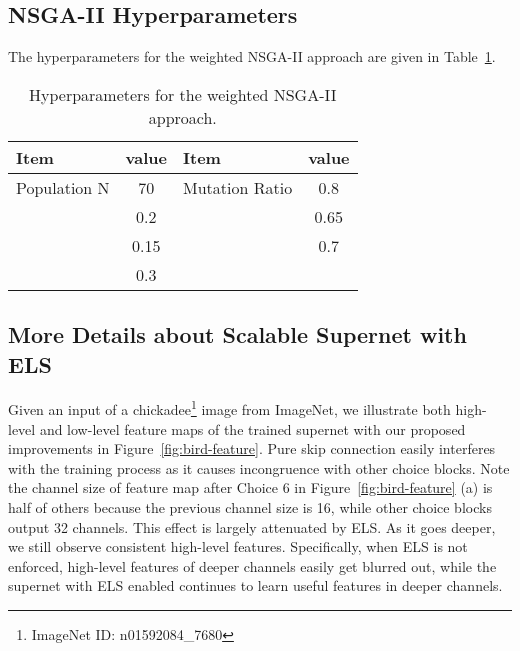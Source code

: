 \documentclass[10pt,twocolumn,letterpaper]{article}
\theoremstyle{definition}
\begin{document}
\subsection{NSGA-II Hyperparameters}
The hyperparameters for the weighted NSGA-II approach are given in Table~\ref{tab:pipelienhyper}.

\begin{table}[ht]	\begin{center}
		\begin{small}
				\begin{tabular}{|l|c|l|c|}
					\hline
					Item & value & Item & value \\
					\hline
					Population N & 70 & Mutation Ratio  & 0.8 \\
					 & 0.2 &    & 0.65 \\
					 & 0.15 &  & 0.7 \\
					 & 0.3 & & \\
					\hline
				\end{tabular}
		\end{small}
	\end{center}
	\smallskip
	\caption{Hyperparameters for the weighted NSGA-II approach.}
	\label{tab:pipelienhyper}
\end{table}

\subsection{More Details about Scalable Supernet with ELS}
Given an input of a chickadee\footnote{ImageNet ID: n01592084\_7680} image from ImageNet, we illustrate both high-level and low-level feature maps of the trained supernet with our proposed improvements in Figure~\ref{fig:bird-feature}. Pure skip connection easily interferes with the training process as it causes incongruence with other choice blocks. Note the channel size of feature map after Choice 6 in Figure~\ref{fig:bird-feature} (a) is half of others because the previous channel size is 16, while other choice blocks output 32 channels. This effect is largely attenuated by ELS. As it goes deeper, we still observe consistent high-level features. Specifically, when ELS is not enforced, high-level features of deeper channels easily get blurred out, while the supernet with ELS enabled continues to learn useful features in deeper channels. 

\begin{figure*}[ht]
	\centering
	\caption{Learned low-level and high-level features for the supernet with and without ELS.}
	\label{fig:bird-feature}
	\vskip -0.1in
\end{figure*}
\end{document}
